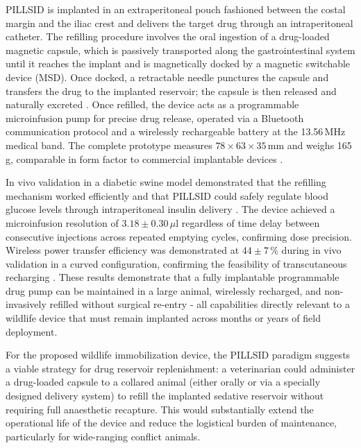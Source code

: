 \documentclass[12pt,a4paper]{article}
\begin{document}
    PILLSID is implanted in an extraperitoneal pouch fashioned between the costal margin and
    the iliac crest and delivers the target drug through an intraperitoneal catheter. The
    refilling procedure involves the oral ingestion of a drug-loaded magnetic capsule, which is
    passively transported along the gastrointestinal system until it reaches the implant and is
    magnetically docked by a magnetic switchable device (MSD). Once docked, a retractable
    needle punctures the capsule and transfers the drug to the implanted reservoir; the capsule
    is then released and naturally excreted \cite{iacovacci2021}. Once refilled, the device acts as
    a programmable microinfusion pump for precise drug release, operated via a Bluetooth
    communication protocol and a wirelessly rechargeable battery at the 13.56\,MHz medical
    band. The complete prototype measures $78 \times 63 \times 35$\,mm and weighs 165\,g,
    comparable in form factor to commercial implantable devices \cite{iacovacci2021}.

    In vivo validation in a diabetic swine model demonstrated that the refilling mechanism
    worked efficiently and that PILLSID could safely regulate blood glucose levels through
    intraperitoneal insulin delivery \cite{iacovacci2021}. The device achieved a microinfusion
    resolution of $3.18 \pm 0.30$\,$\mu$l regardless of time delay between consecutive injections
    across repeated emptying cycles, confirming dose precision. Wireless power transfer
    efficiency was demonstrated at $44 \pm 7$\,\% during in vivo validation in a curved
    configuration, confirming the feasibility of transcutaneous recharging \cite{iacovacci2021}.
    These results demonstrate that a fully implantable programmable drug pump can be
    maintained in a large animal, wirelessly recharged, and non-invasively refilled without
    surgical re-entry - all capabilities directly relevant to a wildlife device that must remain
    implanted across months or years of field deployment.

    For the proposed wildlife immobilization device, the PILLSID paradigm suggests a viable
    strategy for drug reservoir replenishment: a veterinarian could administer a drug-loaded
    capsule to a collared animal (either orally or via a specially designed delivery system) to
    refill the implanted sedative reservoir without requiring full anaesthetic recapture. This
    would substantially extend the operational life of the device and reduce the logistical
    burden of maintenance, particularly for wide-ranging conflict animals.
\end{document}
